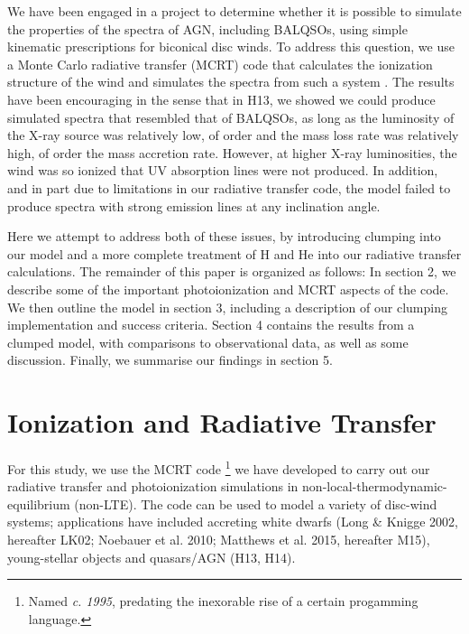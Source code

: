 \documentclass[useAMS,usenatbib]{mn2e_x}
\begin{document}
We have been engaged in a project to determine whether it is possible to simulate the properties of 
the spectra of AGN, including BALQSOs, using simple kinematic prescriptions for biconical disc winds.
To address this question, we use a Monte Carlo radiative transfer (MCRT) code that calculates the ionization structure of the wind 
and simulates the spectra from such a system 
\citep[][hereafter H13 and H14]{simlong2008,sim2010,higginbottom2013,H14}.  The results have been encouraging in the sense that in H13, we showed we could produce simulated spectra that resembled that of BALQSOs, as long as the luminosity of the X-ray source was relatively low, of order  and the mass loss rate was relatively high, of order the mass accretion rate.  However, at higher X-ray luminosities, the wind was so ionized that UV absorption lines were not produced.  In addition, and in part due to limitations in our radiative transfer code, the model failed to produce spectra with strong emission lines at any inclination angle.  

Here we attempt to address both of these issues, by introducing clumping into our model and a more complete treatment of H and He into our radiative transfer calculations.   
The remainder of this paper is organized as follows:
In section 2, we describe some of the important photoionization 
and MCRT aspects of the code. We then outline the model in section 3, including 
a description of our clumping implementation and success criteria. 
Section 4 contains the results from a clumped model, 
with comparisons to observational data, as well as some discussion. 
Finally, we summarise our findings in section 5.





\section{Ionization and Radiative Transfer}

For this study, we use the MCRT code \py 
\footnote{Named {\sl c. 1995}, predating the inexorable rise of a certain progamming language.} we have developed to carry out our 
radiative transfer and photoionization simulations in non-local-thermodynamic-equilibrium 
(non-LTE). The code can be used to model a variety of
disc-wind systems; applications have included accreting white dwarfs 
(Long \& Knigge 2002, hereafter LK02; Noebauer et al. 2010; 
Matthews et al. 2015, hereafter M15), young-stellar objects 
\citep{simmacro2005} and quasars/AGN (H13, H14).\nocite{noebauer, M15, LK02}  
\end{document}
